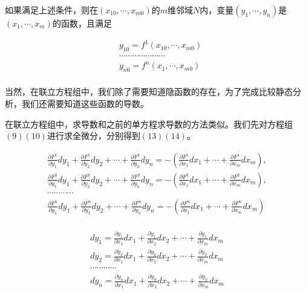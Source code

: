 \documentclass[UTF8,12pt]{ctexart}
\numberwithin{equation}{section} %
\numberwithin{figure}{section}
\numberwithin{table}{section}
\begin{document}
	如果满足上述条件，则在$(x_{10},\cdots,x_{m0})$的$m$维邻域$N$内，变量$(y_{1},\cdots,y_{n})$是$(x_{1},\cdots,x_{m})$的函数，且满足
	
	\begin{equation}
		\begin{aligned}
			&y_{10} = f^1(x_{10},\cdots,x_{m0}) \\
			&\cdots \cdots \cdots \cdots \cdots \cdots \cdots  \\
			&y_{n0} = f^n(x_1,\cdots,x_{m0}) \\
		\end{aligned} 
	\end{equation}
	
	当然，在联立方程组中，我们除了需要知道隐函数的存在，为了完成比较静态分析，我们还需要知道这些函数的导数。
	
	在联立方程组中，求导数和之前的单方程求导数的方法类似。我们先对方程组$(9)(10)$进行求全微分，分别得到$(13)(14)$。
	
	\begin{equation}
		\begin{aligned}
			\frac{\partial F^1}{\partial y_1}dy_1 + \frac{\partial F^1}{\partial y_2}dy_2 + \cdots + \frac{\partial F^1}{\partial y_n}dy_n 
			=  - (\frac{\partial F^1}{\partial x_1}dx_1 + \cdots + \frac{\partial F^1}{\partial x_m}dx_m), \\
			\frac{\partial F^2}{\partial y_1}dy_1 + \frac{\partial F^2}{\partial y_2}dy_2 + \cdots + \frac{\partial F^2}{\partial y_n}dy_n 
			=  - (\frac{\partial F^2}{\partial x_1}dx_1 + \cdots + \frac{\partial F^2}{\partial x_m}dx_m), \\
			\cdots \cdots \cdots \cdots \\
			\frac{\partial F^n}{\partial y_1}dy_1 + \frac{\partial F^n}{\partial y_2}dy_2 + \cdots + \frac{\partial F^n}{\partial y_n}dy_n 
			=  - (\frac{\partial F^n}{\partial x_1}dx_1 + \cdots + \frac{\partial F^n}{\partial x_m}dx_m) \\
		\end{aligned}
	\end{equation}
	
	\begin{equation}
		\begin{aligned}
			dy_1 = \frac{\partial y_1}{\partial x_1}dx_1 + \frac{\partial y_1}{\partial x_2}dx_2 + \cdots + \frac{\partial y_1}{\partial x_m}dx_m \\
			dy_2 = \frac{\partial y_2}{\partial x_1}dx_1 + \frac{\partial y_2}{\partial x_2}dx_2 + \cdots + \frac{\partial y_2}{\partial x_m}dx_m \\
			\cdots \cdots \cdots \cdots \\
			dy_n = \frac{\partial y_n}{\partial x_1}dx_1 + \frac{\partial y_n}{\partial x_2}dx_2 + \cdots + \frac{\partial y_n}{\partial x_m}dx_m \\
		\end{aligned}
	\end{equation}
	
\end{document}
